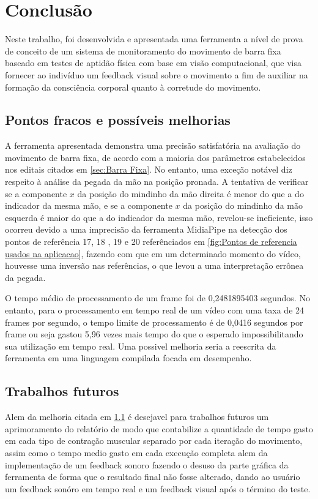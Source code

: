 \chapter{Conclusão}

Neste trabalho, foi desenvolvida e apresentada uma ferramenta a nível de prova de conceito de um sistema de monitoramento do movimento de barra fixa baseado em testes de aptidão física com base em visão computacional, que visa fornecer ao indivíduo um feedback visual sobre o movimento a fim de auxiliar na formação da consciência corporal quanto à corretude do movimento.


\section[Pontos fracos e possíveis melhorias]{Pontos fracos e possíveis melhorias}\label{sec:Pontos fracos e possiveis melhorias}

A ferramenta apresentada demonstra uma precisão satisfatória na avaliação do movimento de barra fixa, de acordo com a maioria dos parâmetros estabelecidos nos editais citados em \ref{sec:Barra Fixa}. No entanto, uma exceção notável diz respeito à análise da pegada da mão na posição pronada. A tentativa de verificar se a componente $x$ da posição do mindinho da mão direita é menor do que a do indicador da mesma mão, e se a componente $x$ da posição do mindinho da mão esquerda é maior do que a do indicador da mesma mão, revelou-se ineficiente, isso ocorreu devido a uma imprecisão da ferramenta MidiaPipe na detecção dos pontos de referência 17, 18 , 19 e 20 referênciados em \ref{fig:Pontos de referencia usados na aplicacao}, fazendo com que em um determinado momento do vídeo, houvesse uma inversão nas referências, o que levou a uma interpretação errônea da pegada.

O tempo médio de processamento de um frame foi de 0,2481895403 segundos. No entanto, para o processamento em tempo real de um vídeo com uma taxa de 24 frames por segundo, o tempo limite de processamento é de 0,0416 segundos por frame ou seja gastou 5,96 vezes mais tempo do que o esperado impossibilitando sua utilização em tempo real. Uma possivel melhoria seria a reescrita da ferramenta em uma linguagem compilada focada em desempenho.






\section[Trabalhos futuros]{Trabalhos futuros}
Alem da melhoria citada em \ref{sec:Pontos fracos e possiveis melhorias} é desejavel para trabalhos futuros um aprimoramento do relatório de modo que contabilize a quantidade de tempo gasto em cada tipo de contração muscular separado por cada iteração do movimento, assim como o tempo medio gasto em cada execução completa alem da implementação de um feedback sonoro fazendo o desuso da parte gráfica da ferramenta de forma que o resultado final não fosse alterado, dando ao usuário um feedback sonóro em tempo real e um feedback visual após o término do teste. 